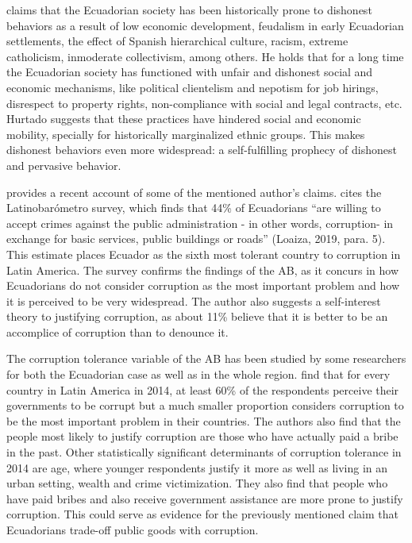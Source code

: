 \documentclass[floatsintext,man]{apa7}\usepackage[]{graphicx}\usepackage[]{color}
\begin{document}
\textcite{Hurtado.2007} claims that the Ecuadorian society has been historically prone to dishonest behaviors as a result of low economic development, feudalism in early Ecuadorian settlements, the effect of Spanish hierarchical culture, racism, extreme catholicism, inmoderate collectivism, among others. He holds that for a long time the Ecuadorian society has functioned with unfair and dishonest social and economic mechanisms, like political clientelism and nepotism for job hirings, disrespect to property rights, non-compliance with social and legal contracts, etc. Hurtado suggests that these practices have hindered social and economic mobility, specially for historically marginalized ethnic groups. This makes dishonest behaviors even more widespread: a self-fulfilling prophecy of dishonest and pervasive behavior. 

\textcite{Loaiza.2019} provides a recent account of some of the mentioned author's claims. \textcite{Loaiza.2019} cites the Latinobarómetro survey, which finds that 44\% of Ecuadorians \enquote{are willing to accept crimes against the public administration - in other words, corruption- in exchange for basic services, public buildings or roads} (Loaiza, 2019, para. 5). This estimate places Ecuador as the sixth most tolerant country to corruption in Latin America. The survey confirms the findings of the AB, as it concurs in how Ecuadorians do not consider corruption as the most important problem and how it is perceived to be very widespread. The author also suggests a self-interest theory to justifying corruption, as about 11\% believe that it is better to be an accomplice of corruption than to denounce it. 

The corruption tolerance variable of the AB has been studied by some researchers for both the Ecuadorian case as well as in the whole region. \textcite{Singer.2016} find that for every country in Latin America in 2014, at least 60\% of the respondents perceive their governments to be corrupt but a much smaller proportion considers corruption to be the most important problem in their countries. The authors also find that the people most likely to justify corruption are those who have actually paid a bribe in the past. Other statistically significant determinants of corruption tolerance in 2014 are age, where younger respondents justify it more as well as living in an urban setting, wealth and crime victimization. They also find that people who have paid bribes and also receive government assistance are more prone to justify corruption. This could serve as evidence for the previously mentioned claim that Ecuadorians trade-off public goods with corruption.
\end{document}
